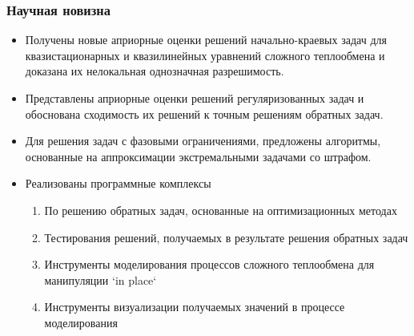 \begin{frame}
    \frametitle{Научная новизна}
    \begin{itemize}
        \item Получены новые априорные оценки решений начально-краевых задач для
        квазистационарных и квазилинейных уравнений сложного теплообмена и доказана
        их нелокальная однозначная разрешимость.
        \item Представлены априорные
        оценки решений регуляризованных задач и обоснована сходимость их решений к
        точным решениям обратных задач.
        \item Для решения задач с фазовыми ограничениями,
        предложены алгоритмы, основанные на аппроксимации экстремальными
        задачами со штрафом.
        \item Реализованы программные комплексы
        \begin{enumerate}
            \item По решению обратных задач, основанные на оптимизационных методах
            \item Тестирования решений, получаемых в результате решения обратных задач
            \item Инструменты моделирования процессов сложного теплообмена для манипуляции `in place`
            \item Инструменты визуализации получаемых значений в процессе моделирования
        \end{enumerate}
    \end{itemize}
    \begin{minipage}[t]{.25\linewidth}
    \end{minipage}
    \hfill
    \begin{minipage}[t]{.25\linewidth}
    \end{minipage}
    \hfill
    \begin{minipage}[t]{.25\linewidth}
    \end{minipage}
\end{frame}
